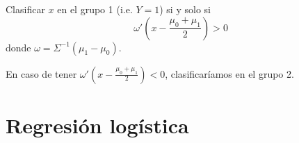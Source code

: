 \begin{defn} Clasificar $x$ en el grupo 1 (i.e. $Y=1$) si y solo si
\[
ω'\left(x-\frac{\mu_0 + \mu_1}{2}\right)>0
\]
donde $ω=\Sigma^{-1}(\mu_1-\mu_0).$

En caso de tener $ω'\left(x-\frac{\mu_0 + \mu_1}{2}\right)<0$, clasificaríamos en el grupo 2.
\end{defn}


\section{Regresión logística}